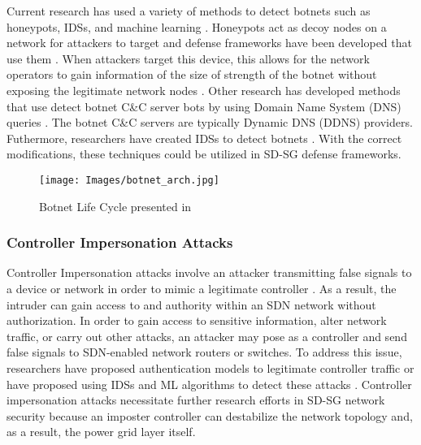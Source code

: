 \documentclass[conference]{IEEEtran}
\begin{document}
    Current research has used a variety of methods to detect botnets such as honeypots, IDSs, and machine learning \cite{shinan2021machine}. Honeypots act as decoy nodes on a network for attackers to target and defense frameworks have been developed that use them \cite{luo2019using,ja2021intelligent, shafi2019ddos}. When attackers target this device, this allows for the network operators to gain information of the size of strength of the botnet without exposing the legitimate network nodes \cite{wang2019sdn}. Other research has developed methods that use detect botnet C\&C server bots by using Domain Name System (DNS) queries \cite{sanjeetha2021detection,zafar2019botnet, zha2019botsifter}. The botnet C\&C servers are typically Dynamic DNS (DDNS) providers. Futhermore, researchers have created IDSs to detect botnets \cite{ieracitano2020novel,nguyen2020genetic,ashraf2021intrusion}. With the correct modifications, these techniques could be utilized in SD-SG defense frameworks. 
    \begin{figure}[h]
\centering
\texttt{[image: Images/botnet\_arch.jpg]}
\caption{Botnet Life Cycle presented in \cite{shinan2021machine}}
\label{fig:botnet_arch}
\end{figure}

    
\subsubsection{Controller Impersonation Attacks} Controller Impersonation attacks involve an attacker transmitting false signals to a device or network in order to mimic a legitimate controller \cite{mutaher2021security, li2016survey}. As a result, the intruder can gain access to and authority within an SDN network without authorization. In order to gain access to sensitive information, alter network traffic, or carry out other attacks, an attacker may pose as a controller and send false signals to SDN-enabled network routers or switches. To address this issue, researchers have proposed authentication models to legitimate controller traffic  \cite{mutaher2021security} or have proposed using IDSs and ML algorithms to detect these attacks \cite{derhab2019blockchain}. Controller impersonation attacks necessitate further research efforts in SD-SG network security because an imposter controller can destabilize the network topology and, as a result, the power grid layer itself. 
    
\end{document}
